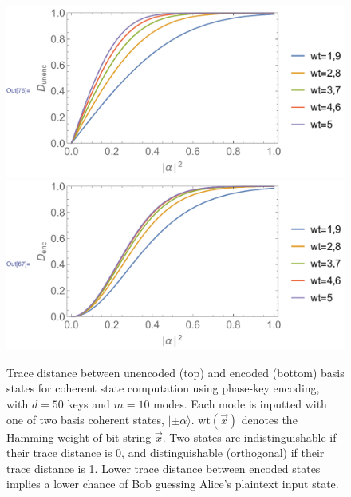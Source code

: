 \documentclass[aps,rmp,twocolumn,amsmath,amssymb,nofootinbib,superscriptaddress,longbibliography,floatfix,table-of-contents,eqsecnum]{revtex4-1}
\newcommand{\ket}[1]{|#1\rangle}
\begin{document}
\begin{figure}[!htb]
\includegraphics[width=\columnwidth]{coherent_state_homo_unenc} \\
\includegraphics[width=\columnwidth]{coherent_state_homo_enc}
\caption{Trace distance between unencoded (top) and encoded (bottom) basis states for coherent state computation using phase-key encoding, with \mbox{$d=50$} keys and \mbox{$m=10$} modes. Each mode is inputted with one of two basis coherent states, \mbox{$\ket{\pm\alpha}$}. \mbox{$\text{wt}(\vec{x})$} denotes the Hamming weight of bit-string $\vec{x}$. Two states are indistinguishable if their trace distance is 0, and distinguishable (orthogonal) if their trace distance is 1. Lower trace distance between encoded states implies a lower chance of Bob guessing Alice's plaintext input state.} \label{fig:homo_coh_st_tr}
\end{figure}
\end{document}
